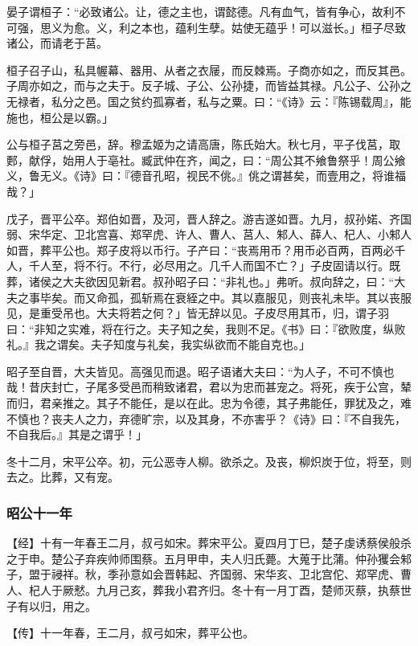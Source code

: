 \documentclass[]{article}
\begin{document}
晏子谓桓子：``必致诸公。让，德之主也，谓懿德。凡有血气，皆有争心，故利不可强，思义为愈。义，利之本也，蕴利生孽。姑使无蕴乎！可以滋长。」桓子尽致诸公，而请老于莒。

桓子召子山，私具幄幕、器用、从者之衣屦，而反棘焉。子商亦如之，而反其邑。子周亦如之，而与之夫于。反子城、子公、公孙捷，而皆益其禄。凡公子、公孙之无禄者，私分之邑。国之贫约孤寡者，私与之粟。曰：``《诗》云：『陈锡载周』，能施也，桓公是以霸。」

公与桓子莒之旁邑，辞。穆孟姬为之请高唐，陈氏始大。秋七月，平子伐莒，取郠，献俘，始用人于亳社。臧武仲在齐，闻之，曰：``周公其不飨鲁祭乎！周公飨义，鲁无义。《诗》曰：『德音孔昭，视民不佻。』佻之谓甚矣，而壹用之，将谁福哉？」

戊子，晋平公卒。郑伯如晋，及河，晋人辞之。游吉遂如晋。九月，叔孙婼、齐国弱、宋华定、卫北宫喜、郑罕虎、许人、曹人、莒人、邾人、薛人、杞人、小邾人如晋，葬平公也。郑子皮将以币行。子产曰：``丧焉用币？用币必百两，百两必千人，千人至，将不行。不行，必尽用之。几千人而国不亡？」子皮固请以行。既葬，诸侯之大夫欲因见新君。叔孙昭子曰：``非礼也。」弗听。叔向辞之，曰：``大夫之事毕矣。而又命孤，孤斩焉在衰絰之中。其以嘉服见，则丧礼未毕。其以丧服见，是重受吊也。大夫将若之何？」皆无辞以见。子皮尽用其币，归，谓子羽曰：``非知之实难，将在行之。夫子知之矣，我则不足。《书》曰：『欲败度，纵败礼。』我之谓矣。夫子知度与礼矣，我实纵欲而不能自克也。」

昭子至自晋，大夫皆见。高强见而退。昭子语诸大夫曰：``为人子，不可不慎也哉！昔庆封亡，子尾多受邑而稍致诸君，君以为忠而甚宠之。将死，疾于公宫，辇而归，君亲推之。其子不能任，是以在此。忠为令德，其子弗能任，罪犹及之，难不慎也？丧夫人之力，弃德旷宗，以及其身，不亦害乎？《诗》曰：『不自我先，不自我后。』其是之谓乎！」

冬十二月，宋平公卒。初，元公恶寺人柳。欲杀之。及丧，柳炽炭于位，将至，则去之。比葬，又有宠。

\hypertarget{header-n2541}{%
\subsubsection{昭公十一年}\label{header-n2541}}

【经】十有一年春王二月，叔弓如宋。葬宋平公。夏四月丁巳，楚子虔诱蔡侯般杀之于申。楚公子弃疾帅师围蔡。五月甲申，夫人归氏薨。大蒐于比蒲。仲孙玃会邾子，盟于祲祥。秋，季孙意如会晋韩起、齐国弱、宋华亥、卫北宫佗、郑罕虎、曹人、杞人于厥憖。九月己亥，葬我小君齐归。冬十有一月丁酉，楚师灭蔡，执蔡世子有以归，用之。

【传】十一年春，王二月，叔弓如宋，葬平公也。
\end{document}
